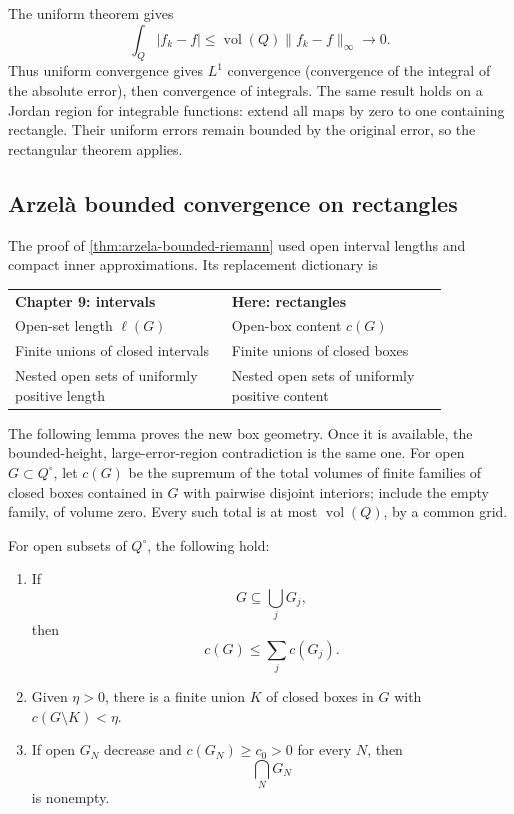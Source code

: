 The uniform theorem gives
\[
\int_Q|f_k-f|\leq\operatorname{vol}(Q)\|f_k-f\|_\infty\longrightarrow0.
\]
Thus uniform convergence gives $L^1$ convergence (convergence of the
integral of the absolute error), then convergence of integrals. The same
result holds on a Jordan region for integrable functions: extend all maps
by zero to one containing rectangle. Their uniform errors remain bounded
by the original error, so the rectangular theorem applies.

\subsection{Arzel\`a bounded convergence on rectangles}
The proof of \cref{thm:arzela-bounded-riemann} used open interval lengths
and compact inner approximations. Its replacement dictionary is
\begin{center}
\begin{tabular}{p{0.43\linewidth}p{0.43\linewidth}}
\textbf{Chapter 9: intervals}&\textbf{Here: rectangles}\\
Open-set length $\ell(G)$&Open-box content $c(G)$\\
Finite unions of closed intervals&Finite unions of closed boxes\\
Nested open sets of uniformly positive length&Nested open sets of uniformly positive content
\end{tabular}
\end{center}
The following lemma proves the new box geometry. Once it is available,
the bounded-height, large-error-region contradiction is the same one.
For open $G\subset Q^\circ$, let $c(G)$ be the supremum of the total
volumes of finite families of closed boxes contained in $G$ with pairwise
disjoint interiors; include the empty family, of volume zero.
Every such total is at most $\operatorname{vol}(Q)$, by a common grid.
\begin{lemma}\label{lem:open-box-content}
For open subsets of $Q^\circ$, the following hold:
\begin{enumerate}[label=(\arabic*)]
\item If
\[
G\subseteq\bigcup_jG_j,
\]
 then
\[
c(G)\leq\sum_jc(G_j).
\]

\item Given $\eta>0$, there is a finite union $K$ of closed boxes in $G$
with $c(G\setminus K)<\eta$.
\item If open $G_N$ decrease and $c(G_N)\geq c_0>0$ for every $N$,
then
\[
\bigcap_N G_N
\]
 is nonempty.
\end{enumerate}
\end{lemma}

